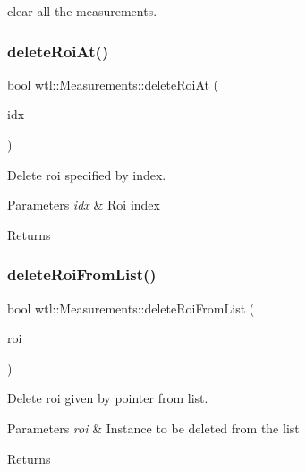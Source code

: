clear all the measurements. 

\mbox{\label{classwtl_1_1_measurements_a7f2320fef6dc9959686054a4bea6f77e}} 
\subsubsection{\texorpdfstring{delete\+Roi\+At()}{deleteRoiAt()}}
{\footnotesize\ttfamily bool wtl\+::\+Measurements\+::delete\+Roi\+At (\begin{DoxyParamCaption}\item[{int}]{idx }\end{DoxyParamCaption})}



Delete roi specified by index. 


\begin{DoxyParams}{Parameters}
{\em idx} & Roi index \\
\hline
\end{DoxyParams}
\begin{DoxyReturn}{Returns}

\end{DoxyReturn}
\mbox{\label{classwtl_1_1_measurements_a7fc7bb55f5b62b18736edd1470660b5e}} 
\subsubsection{\texorpdfstring{delete\+Roi\+From\+List()}{deleteRoiFromList()}}
{\footnotesize\ttfamily bool wtl\+::\+Measurements\+::delete\+Roi\+From\+List (\begin{DoxyParamCaption}\item[{std\+::shared\+\_\+ptr$<$ \hyperlink{structwtl_1_1_roi_struct}{Roi\+Struct} $>$}]{roi }\end{DoxyParamCaption})}



Delete roi given by pointer from list. 


\begin{DoxyParams}{Parameters}
{\em roi} & Instance to be deleted from the list \\
\hline
\end{DoxyParams}
\begin{DoxyReturn}{Returns}

\end{DoxyReturn}
\mbox{\label{classwtl_1_1_measurements_a7120cb85575385e966f0a3af99814a47}} 
